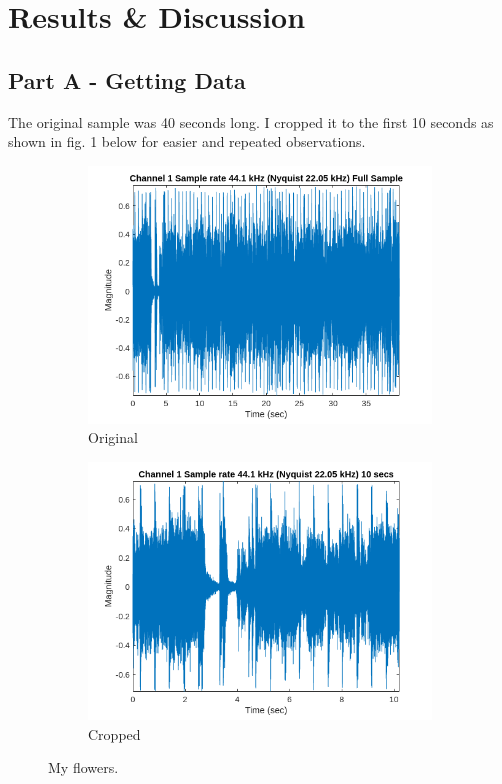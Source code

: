 \documentclass[12pt]{article}
\begin{document}
\newpage
\section{Results \& Discussion}
\subsection{Part A - Getting Data}
The original sample was 40 seconds long. I cropped it to the first 10 seconds as shown in fig. 1 below for easier and repeated observations.

\begin{figure}[htbp]
  \centering
  \begin{subfigure}[b]{0.48\textwidth} %
    \includegraphics[width=\linewidth]{labs/lab1/lab-report-tex/figures/figure_0.png}
    \caption{Original}
    \label{fig:f1}
  \end{subfigure}
  \hfill
  \begin{subfigure}[b]{0.48\textwidth} %
    \includegraphics[width=\linewidth]{labs/lab1/lab-report-tex/figures/figure_1.png}
    \caption{Cropped}
    \label{fig:f2}
  \end{subfigure}
  \caption{My flowers.}
\end{figure}
\FloatBarrier
\end{document}
